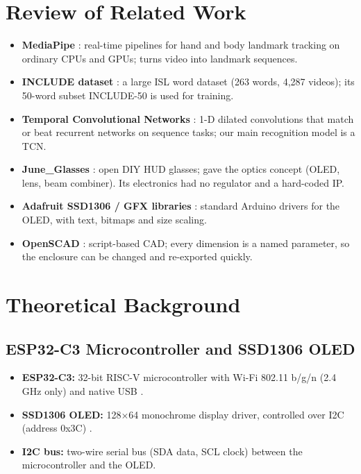 \documentclass[12pt,a4paper]{report}
\begin{document}
\section{Review of Related Work}
\begin{itemize}
  \item \textbf{MediaPipe} \cite{mediapipe}: real-time pipelines for hand and body landmark tracking on ordinary CPUs and GPUs; turns video into landmark sequences.
  \item \textbf{INCLUDE dataset} \cite{include}: a large ISL word dataset (263 words, 4,287 videos); its 50-word subset INCLUDE-50 is used for training.
  \item \textbf{Temporal Convolutional Networks} \cite{tcn}: 1-D dilated convolutions that match or beat recurrent networks on sequence tasks; our main recognition model is a TCN.
  \item \textbf{June\_Glasses} \cite{june}: open DIY HUD glasses; gave the optics concept (OLED, lens, beam combiner). Its electronics had no regulator and a hard-coded IP.
  \item \textbf{Adafruit SSD1306 / GFX libraries} \cite{adafruit1306,adafruitgfx}: standard Arduino drivers for the OLED, with text, bitmaps and size scaling.
  \item \textbf{OpenSCAD} \cite{openscad}: script-based CAD; every dimension is a named parameter, so the enclosure can be changed and re-exported quickly.
\end{itemize}

\section{Theoretical Background}

\subsection{ESP32-C3 Microcontroller and SSD1306 OLED}
\begin{itemize}
  \item \textbf{ESP32-C3:} 32-bit RISC-V microcontroller with Wi-Fi 802.11 b/g/n (2.4\,GHz only) and native USB \cite{esp32c3}.
  \item \textbf{SSD1306 OLED:} 128$\times$64 monochrome display driver, controlled over I2C (address 0x3C) \cite{ssd1306}.
  \item \textbf{I2C bus:} two-wire serial bus (SDA data, SCL clock) between the microcontroller and the OLED.
\end{itemize}
\end{document}
